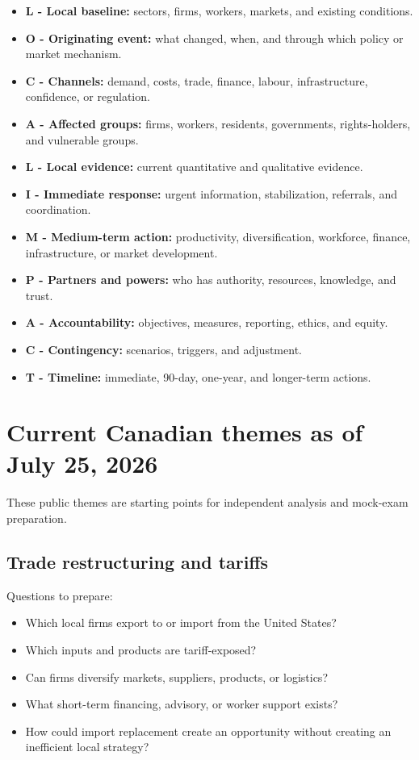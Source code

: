\documentclass[11pt,letterpaper,oneside,openany]{book}
\begin{document}
\begin{itemize}
\item \textbf{L - Local baseline:} sectors, firms, workers, markets, and existing conditions.
\item \textbf{O - Originating event:} what changed, when, and through which policy or market mechanism.
\item \textbf{C - Channels:} demand, costs, trade, finance, labour, infrastructure, confidence, or regulation.
\item \textbf{A - Affected groups:} firms, workers, residents, governments, rights-holders, and vulnerable groups.
\item \textbf{L - Local evidence:} current quantitative and qualitative evidence.
\item \textbf{I - Immediate response:} urgent information, stabilization, referrals, and coordination.
\item \textbf{M - Medium-term action:} productivity, diversification, workforce, finance, infrastructure, or market development.
\item \textbf{P - Partners and powers:} who has authority, resources, knowledge, and trust.
\item \textbf{A - Accountability:} objectives, measures, reporting, ethics, and equity.
\item \textbf{C - Contingency:} scenarios, triggers, and adjustment.
\item \textbf{T - Timeline:} immediate, 90-day, one-year, and longer-term actions.
\end{itemize}


\section[Current Canadian themes as of July 25, 2026]{Current Canadian themes as of July 25, 2026}
These public themes are starting points for independent analysis and mock-exam preparation.


\subsection[Trade restructuring and tariffs]{Trade restructuring and tariffs}
Questions to prepare:


\begin{itemize}
\item Which local firms export to or import from the United States?
\item Which inputs and products are tariff-exposed?
\item Can firms diversify markets, suppliers, products, or logistics?
\item What short-term financing, advisory, or worker support exists?
\item How could import replacement create an opportunity without creating an inefficient local strategy?
\end{itemize}
\end{document}
